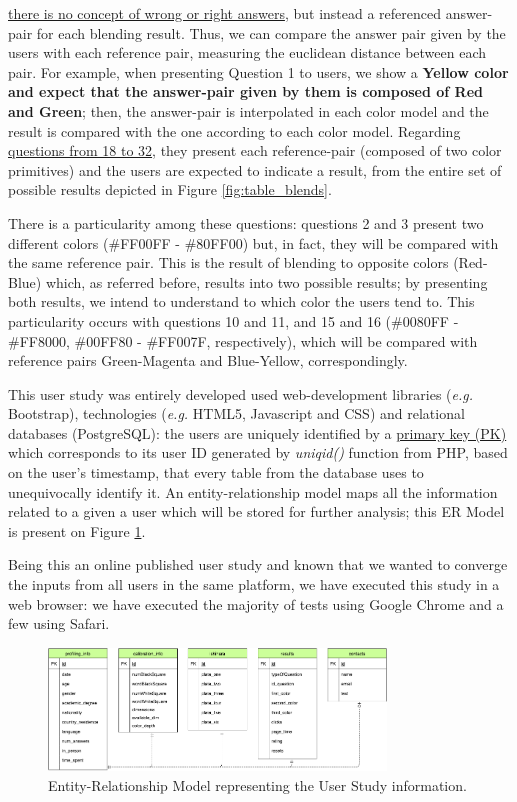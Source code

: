 \ul{there is no concept of wrong or right answers}, but instead a referenced answer-pair for each blending result. Thus, we can compare the answer
pair given by the users with each reference pair, measuring the euclidean distance between each pair. For example, when presenting Question 1 to users,
we show a \textbf{Yellow color and expect that the answer-pair given by them is composed of Red and Green}; then, the answer-pair is interpolated in each
color model and the result is compared with the one according to each color model. Regarding \ul{questions from 18 to 32}, they present each reference-pair
(composed of two color primitives) and the users are expected to indicate a result, from the entire set of possible results depicted in Figure
\ref{fig:table_blends}. \par
%
There is a particularity among these questions: questions 2 and 3 present two different colors (\#FF00FF - \#80FF00) but, in fact, they will be compared with
the same reference pair. This is the result of blending to opposite colors (Red-Blue) which, as referred before, results into two possible results; by
presenting both results, we intend to understand to which color the users tend to. This particularity occurs with questions 10 and 11, and 15 and 16
(\#0080FF - \#FF8000, \#00FF80 - \#FF007F, respectively), which will be compared with reference pairs Green-Magenta and Blue-Yellow, correspondingly. \par
%
This user study was entirely developed used web-development libraries (\emph{e.g.} Bootstrap), technologies (\emph{e.g.} HTML5, Javascript
and CSS) and relational databases (PostgreSQL): the users are uniquely identified by a \ul{primary key (PK)} which corresponds to its user ID generated
by \emph{uniqid()} function from PHP, based on the user's timestamp, that every table from the database uses to unequivocally identify it.
An entity-relationship model maps all the information related to a given a user which will be stored for further analysis; this ER Model is present on
Figure \ref{fig:er_model}. \par
%
Being this an online published user study and known that we wanted to converge the inputs from all users in the same platform, we have executed this study
in a web browser: we have executed the majority of tests using Google Chrome and a few using Safari.
%
\begin{figure}[htbp]
	\centering
  \includegraphics[width=0.8\textwidth]{images/implementation/tables_schema.png}
  \caption[Entity-Relationship Model representing the User Study information.]{Entity-Relationship Model representing the User Study information.}
  \label{fig:er_model}
\end{figure}
%
%
